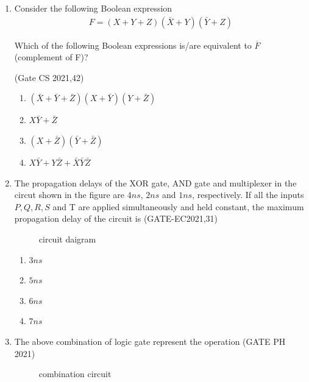 \begin{enumerate}
	\item Consider the following Boolean expression
	      \begin{align*} F = (X+Y+Z)(\bar{X}+Y)(\bar{Y}+Z) \end{align*}

	      Which of the following Boolean expressions is/are equivalent to $\overline{F}$ (complement of
	      F)?

	      \hfill{(Gate CS 2021,42)}
	      \begin{enumerate}
		      \item $(\bar{X}+\bar{Y}+\bar{Z})(X+\bar{Y})(Y+\bar{Z})$
		      \item $X\bar{Y}+\bar{Z}$
		      \item $(X+\bar{Z})(\bar{Y}+\bar{Z})$
		      \item $X\bar{Y}+Y\bar{Z}+\bar{X}\bar{Y}\bar{Z}$
	      \end{enumerate}

	\item The propagation delays of the XOR gate, AND gate and multiplexer  in the circut shown in the figure are $4 ns$, $2 ns$ and $1 ns$, respectively.
	      If all the inputs $P, Q, R, S$ and T are applied simultaneously and held constant, the maximum propagation delay of the circuit is
	      \hfill(GATE-EC2021,31)

	      \begin{figure}[H]
		      
		      \caption{circuit daigram}
		      \label{fig:block_diagram}
	      \end{figure}
	      \begin{enumerate}

		      \item $3 ns$
		      \item $5 ns$
		      \item $6 ns$
		      \item $7 ns$
	      \end{enumerate}
	\item  The above combination of logic gate represent the operation
	      \hfill(GATE PH 2021)
	      \begin{figure}[H]
		      \centering
		      
		      \caption{combination circuit}
	      \end{figure}


\end{enumerate}
